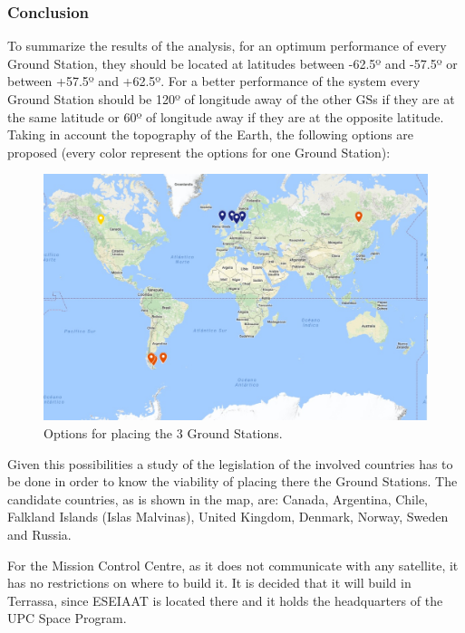 \subsubsection{Conclusion}
To summarize the results of the analysis, for an optimum performance of every Ground Station, they should be located at latitudes between -62.5º and -57.5º or between +57.5º and +62.5º. For a better performance of the system every Ground Station should be 120º of longitude away of the other GSs if they are at the same latitude or 60º of longitude away if they are at the opposite latitude. Taking in account the topography of the Earth, the following options are proposed (every color represent the options for one Ground Station):
\begin{figure}[H]
\begin{center}
\includegraphics[scale=0.5]{Options.jpg}
\caption{Options for placing the 3 Ground Stations.}
\end{center}
\end{figure}

Given this possibilities a study of the legislation of the involved countries has to be done in order to know the viability of placing there the Ground Stations. The candidate countries, as is shown in the map, are: Canada, Argentina, Chile, Falkland Islands (Islas Malvinas), United Kingdom, Denmark, Norway, Sweden and Russia. 

For the Mission Control Centre, as it does not communicate with any satellite, it has no restrictions on where to build it. It is decided that it will build in Terrassa, since ESEIAAT is located there and it holds the headquarters of the UPC Space Program.